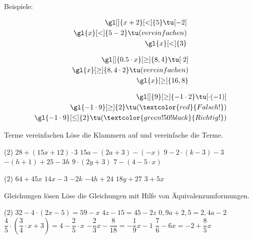\documentclass[12pt,a5paper,landscape]{scrartcl}
\begin{document}
\begin{loesungskarte}[Ungleichungen]
	Beispiele:
	\begin{multicols}{2}
	\begin{alignat*}{3}
		\gl[]{x + 2}[<]{5} \tu[-2] \\
		\gl{x}[<]{5 - 2} \tu(vereinfachen) \\
		\gl{x}[<]{3}
	\end{alignat*}
	
	\begin{alignat*}{3}
		\gl[]{0.5\cdot x}[\geq]{8,4} \tu[\cdot 2] \\
		\gl{x}[\geq]{8,4\cdot 2} \tu(vereinfachen) \\
		\gl{x}[\geq]{16,8}
	\end{alignat*}
	\end{multicols}
	
	\begin{alignat*}{3}
		\gl[]{9}[\geq]{-1\cdot 2} \tu[\cdot (-1)] \\
		\gl{-1\cdot 9}[\geq]{2} \tu(\textcolor{red}{Falsch!}) \\
		\gl{-1\cdot 9}[\leq]{2} \tu(\textcolor{green!50!black}{Richtig!}) \\
	\end{alignat*}
\end{loesungskarte}

\begin{karte1}{Terme vereinfachen}
	Löse die Klammern auf und vereinfache die Terme.
	
	\begin{tasks}(2)
		\task $28 + (15x + 12) \cdot 3$
		\task $15a - (2a + 3) - (-x)$
		\task $9 - 2\cdot ( k-3) - 3$
		\task $-(h + 1) + 25 -3h$
		\task $9 \cdot(2y + 3)$
		\task $7-(4-5\cdot x)$
	\end{tasks}
\end{karte1}

\begin{loesungskarte}
	\begin{tasks}(2)
		\task $64 + 45x$
		\task $14x - 3$
		\task $-2k$
		\task $-4h + 24$
		\task $18y + 27$
		\task $3 + 5x$
	\end{tasks}
\end{loesungskarte}

\begin{karte1}{Gleichungen lösen}
	Löse die Gleichungen mit Hilfe von Äquivalenzumformungen.
	
	\begin{tasks}(2)
		\task $32 - 4\cdot (2x - 5) = 59 -x $
		\task $4z - 15 = 45 - 2z$
		\task $0,9a + 2,5 = 2,4a - 2$
		\task $\dfrac{4}{5} \cdot \left( \dfrac{3}{4} \cdot x + 3 \right) = 4 - \dfrac{2}{5}\cdot  x$
		\task $-\dfrac{2}{3}x - \dfrac{8}{18} = -\dfrac{1}{9}x - 1$
		\task $\dfrac{7}{6} - 6x = -2 + \dfrac{8}{5}x$
	\end{tasks}
\end{karte1}
\end{document}
